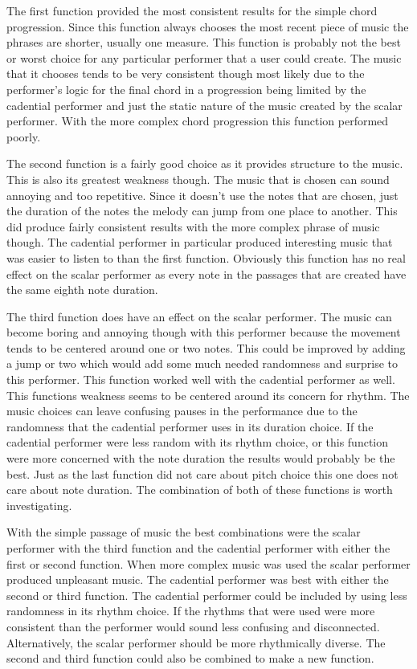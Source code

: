 \documentclass[12pt]{ucthesis}
\begin{document}
{The first function provided the most consistent results for the simple chord progression. Since this function always chooses the most recent piece of music the phrases are shorter, usually one measure. This function is probably not the best or worst choice for any particular performer that a user could create. The music that it chooses tends to be very consistent though most likely due to the performer's logic for the final chord in a progression being limited by the cadential performer and just the static nature of the music created by the scalar performer.  With the more complex chord progression this function performed poorly.

The second function is a fairly good choice as it provides structure to the music. This is also its greatest weakness though. The music that is chosen can sound annoying and too repetitive. Since it doesn't use the notes that are chosen, just the duration of the notes the melody can jump from one place to another. This did produce fairly consistent results with the more complex phrase of music though. The cadential performer in particular produced interesting music that was easier to listen to than the first function. Obviously this function has no real effect on the scalar performer as every note in the passages that are created have the same eighth note duration.

The third function does have an effect on the scalar performer. The music can become boring and annoying though with this performer because the movement tends to be centered around one or two notes. This could be improved by adding a jump or two which would add some much needed randomness and surprise to this performer. This function worked well with the cadential performer as well. This functions weakness seems to be centered around its concern for rhythm. The music choices can leave confusing pauses in the performance due to the randomness that the cadential performer uses in its duration choice. If the cadential performer were less random with its rhythm choice, or this function were more concerned with the note duration the results would probably be the best. Just as the last function did not care about pitch choice this one does not care about note duration. The combination of both of these functions is worth investigating. 

With the simple passage of music the best combinations were the scalar performer with the third function and the cadential performer with either the first or second function. When more complex music was used the scalar performer produced unpleasant music. The cadential performer was best with either the second or third function. The cadential performer could be included by using less randomness in its rhythm choice. If the rhythms that were used were more consistent than the performer would sound less confusing and disconnected. Alternatively, the scalar performer should be more rhythmically diverse. The second and third function could also be combined to make a new function. 

}
\end{document}
